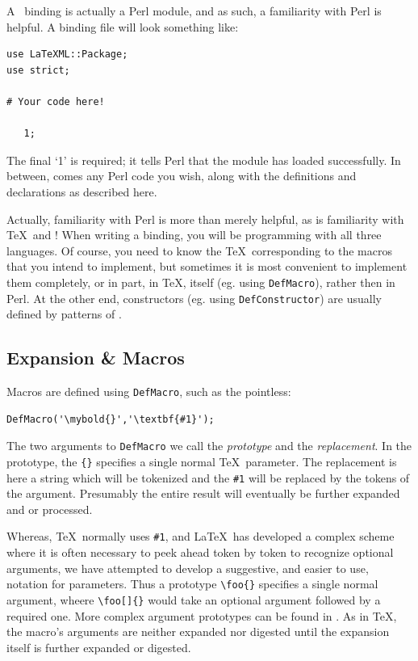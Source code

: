 \documentclass{book}
\newcommand{\ltxcode}{\lstinline[style=latexml]}
\begin{document}
A \LaTeXML\ binding is actually a Perl module, and as such, 
a familiarity with Perl is helpful.
A binding file will look something like:
\begin{lstlisting}[style=latexml]
use LaTeXML::Package;
use strict;

# Your code here!

   1;
\end{lstlisting}
The final `1' is required; it tells Perl that the module has loaded successfully.
In between, comes any Perl code you wish, along with the definitions
and declarations as described here.

Actually, familiarity with Perl is more than merely helpful, as is familiarity
with \TeX\ and \XML! When writing a binding, you will be programming with all
three languages.  Of course, you need to know the \TeX\ corresponding to
the macros that you intend to implement, but sometimes it is most convenient
to implement them completely, or in part, in \TeX, itself (eg. using \ltxcode|DefMacro|),
rather then in Perl. At the other end, constructors (eg. using \ltxcode|DefConstructor|)
are usually defined by patterns of \XML.

\subsection[Expansion]{Expansion \& Macros}\label{customization.latexml.expansion}
Macros are defined using \texttt{DefMacro}, such as the pointless:
\begin{lstlisting}[style=latexml]
  DefMacro('\mybold{}','\textbf{#1}');
\end{lstlisting}
The two arguments to \texttt{DefMacro} we call
the \emph{prototype} and the \emph{replacement}.
In the prototype, the \verb|{}| specifies a single normal \TeX\ parameter.
The replacement is here a string which will
be tokenized and the \verb|#1| will be replaced by the
tokens of the argument. Presumably the entire result will
eventually be further expanded and or processed.

Whereas, \TeX\ normally uses \verb|#1|, and \LaTeX\ has developed
a complex scheme where it is often necessary to peek ahead token
by token to recognize optional arguments, we have attempted
to develop a suggestive, and easier to use, notation for parameters.
Thus a prototype \verb|\foo{}| specifies a single normal argument,
wheere \verb|\foo[]{}| would take an optional argument followed
by a required one.  More complex argument prototypes can be
found in .
As in \TeX, the macro's arguments are neither expanded
nor digested until the expansion itself is further
expanded or digested.
\end{document}
